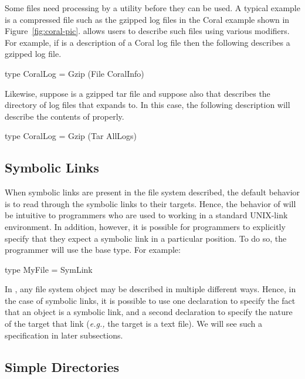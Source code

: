 \documentclass[natbib]{sigplanconf}
\begin{document}
Some files need processing by a utility before they can be used.  A typical
example is a compressed file such as the gzipped log files in the Coral
example shown in Figure~\ref{fig:coral-pic}.  \forest{} allows users to describe such 
files using various modifiers.  For example, if  is a \padshaskell{}
description of a Coral log file then the following describes a gzipped log file.
\begin{code}
type CoralLog = Gzip (File CoralInfo)
\end{code}
Likewise, suppose  is a gzipped tar file and suppose also that 
 describes the directory of log files that  expands
to.  In this case, the following description will describe the contents of
 properly.
\begin{code}
type CoralLog = Gzip (Tar AllLogs)
\end{code}

\subsection{Symbolic Links}
\label{sec:symlinks}

When symbolic links are present in the file system described,
the default behavior is to read through the symbolic links to their
targets.  Hence, the behavior of \forest{} will be intuitive to programmers who
are used to working in a standard UNIX-link environment.  In addition, however, it is possible
for programmers to explicitly specify that they expect a symbolic link in a particular
position.  To do so, the programmer will use the  base type.  For
example:
\begin{code}
type MyFile = SymLink
\end{code}
In \forest{}, any file system object may be described in multiple different ways.
Hence, in the case of symbolic links, it is possible to use one declaration to
specify the fact that an object is a symbolic link, and a second declaration to specify
the nature of the target that link ({\em e.g.,} the target is a text file).  We will see such 
a specification in later subsections.

\subsection{Simple Directories}
\label{sec:simple-directories}
\end{document}
